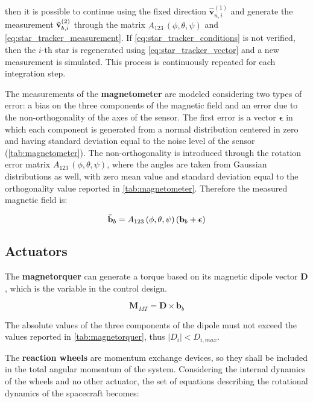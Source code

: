 then it is possible to continue using the fixed direction $\hat{\mathbf{v}}_{n,i}^{(1)}$ and generate the measurement $\Tilde{\mathbf{v}}_{b,i}^{(2)}$ through the matrix $A_{123}\,(\phi, \theta, \psi)$ and \cref{eq:star_tracker_measurement}. If \cref{eq:star_tracker_conditions} is not verified, then the $i$-th star is regenerated using \cref{eq:star_tracker_vector} and a new measurement is simulated. This process is continuously repeated for each integration step.

The measurements of the \textbf{magnetometer} are modeled considering two types of error: a bias on the three components of the magnetic field and an error due to the non-orthogonality of the axes of the sensor. The first error is a vector $\bm{\epsilon}$ in which each component is generated from a normal distribution centered in zero and having standard deviation equal to the noise level of the sensor (\cref{tab:magnetometer}). The non-orthogonality is introduced through the rotation error matrix $A_{123}\,(\phi, \theta, \psi)$, where the angles are taken from Gaussian distributions as well, with zero mean value and standard deviation equal to the orthogonality value reported in \cref{tab:magnetometer}. Therefore the measured magnetic field is:

\begin{equation}
    \Tilde{\mathbf{b}}_b = A_{123}\,(\phi, \theta, \psi)\,(\mathbf{b}_b + \bm{\epsilon})
\end{equation}

\subsection{Actuators}

The \textbf{magnetorquer} can generate a torque based on its magnetic dipole vector $\mathbf{D}$, which is the variable in the control design.

\begin{equation}
    \mathbf{M}_{MT} = \mathbf{D} \times \mathbf{b}_b
\end{equation}

The absolute values of the three components of the dipole must not exceed the values reported in \cref{tab:magnetorquer}, thus $| D_i | < D_{i,max}$.

The \textbf{reaction wheels} are momentum exchange devices, so they shall be included in the total angular momentum of the system. Considering the internal dynamics of the wheels and no other actuator, the set of equations describing the rotational dynamics of the spacecraft becomes:

